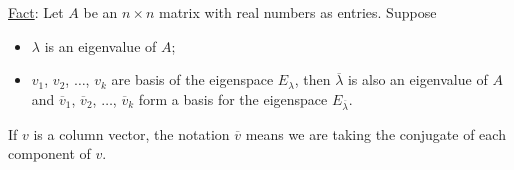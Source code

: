 \documentclass[12pt,a4paper]{article}
\begin{document}
		\newpage
		
		\phantom{2}
		
		\vfill
		
		\underline{Fact}: Let $A$ be an $n \times n$ matrix with real numbers as entries. Suppose
			\begin{itemize}
			\item $\lambda$ is an eigenvalue of $A$;
			\item $v_1$, $v_2$, $\ldots$, $v_k$ are basis of the eigenspace $E_{\lambda}$, then $\overline{\lambda}$ is also an eigenvalue of $A$ and $\overline{v}_1$, $\overline{v}_2$, $\ldots$, $\overline{v}_k$ form a basis for the eigenspace $E_{\overline{\lambda}}$.
			\end{itemize}
			
		If $v$ is a column vector, the notation $\overline{v}$ means we are taking the conjugate of each component of $v$.
			
\end{document}
